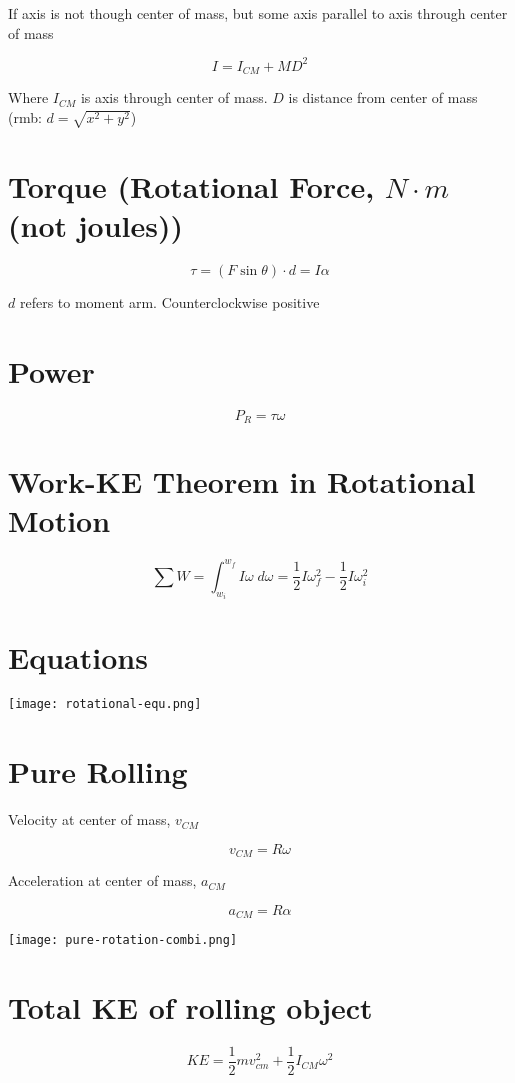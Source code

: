 \documentclass[12pt]{article}
\begin{document}
\begin{spacing}{1.5}
If axis is not though center of mass, but some axis parallel to axis through center of mass

$$I = I_{CM} + MD^2$$

Where $I_{CM}$ is axis through center of mass. $D$ is distance from center of mass (rmb: $d = \sqrt{x^2 + y^2}$)

\section{Torque (Rotational Force, $N \cdot m$ (not joules))}

$$\tau = (F \sin{\theta}) \cdot d = I \alpha$$

$d$ refers to moment arm. Counterclockwise positive

\section{Power}

$$P_R = \tau \omega$$

\section{Work-KE Theorem in Rotational Motion}

$$\sum W = \int_{w_i}^{w_f} I \omega \; d \omega = \frac{1}{2} I \omega_f^2 - \frac{1}{2} I \omega_i^2$$

\section{Equations}

\texttt{[image: rotational-equ.png]}

\section{Pure Rolling}

Velocity at center of mass, $v_{CM}$

$$v_{CM} = R \omega$$

Acceleration at center of mass, $a_{CM}$

$$a_{CM} = R \alpha$$

\texttt{[image: pure-rotation-combi.png]}

\section{Total KE of rolling object}

$$KE = \frac{1}{2} mv_{cm}^2 + \frac{1}{2} I_{CM} \omega^2$$

\end{spacing}
\end{document}
